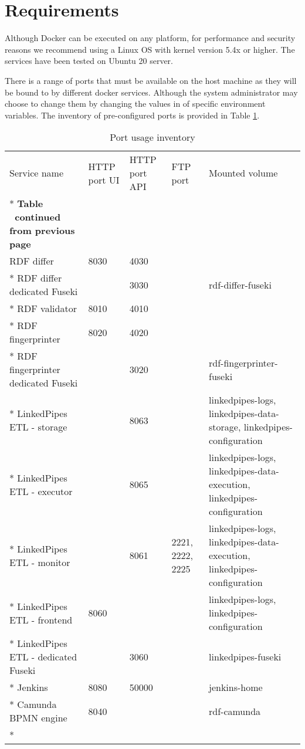\section{Requirements}
\label{sec:requirements}

	Although Docker can be executed on any platform, for performance and security reasons we recommend using a Linux OS with kernel version 5.4x or higher. The services have been tested on Ubuntu 20 server. 
		
	There is a range of ports that must be available on the host machine as they will be bound to by different docker services. Although the system administrator may choose to change them by changing the values in of specific environment variables. The inventory of pre-configured ports is provided in Table \ref{tab:port-inventory}.

	\begin{longtable}[c]{@{}p{3.64cm}p{1.25cm}p{1.25cm}p{1.9cm}p{5cm}@{}}
		\toprule
		Service name & HTTP port UI & HTTP port API & FTP port & Mounted volume \\* \midrule
		\endfirsthead
		\multicolumn{5}{c}%
		{{\bfseries Table \thetable\ continued from previous page}} \\
		\endhead
		\bottomrule
		\endfoot
		\endlastfoot
		RDF differ & 8030 & 4030 &  &  \\* \hline
		RDF differ dedicated Fuseki &  & 3030 &  & rdf-differ-fuseki \\* \hline
		RDF validator & 8010 & 4010 &  &  \\* \hline
		RDF fingerprinter & 8020 & 4020 &  &  \\* \hline
		RDF fingerprinter dedicated Fuseki &  & 3020 &  & rdf-fingerprinter-fuseki \\* \hline
		LinkedPipes ETL - storage &  & 8063 &  & linkedpipes-logs, linkedpipes-data-storage, linkedpipes-configuration \\* \hline
		LinkedPipes ETL - executor &  & 8065 &  & linkedpipes-logs, linkedpipes-data-execution, linkedpipes-configuration \\* \hline
		LinkedPipes ETL - monitor &  & 8061 & 2221, 2222, 2225 & linkedpipes-logs, linkedpipes-data-execution, linkedpipes-configuration \\* \hline
		LinkedPipes ETL - frontend & 8060 &  &  & linkedpipes-logs, linkedpipes-configuration \\* \hline
		LinkedPipes ETL - dedicated Fuseki &  & 3060 &  & linkedpipes-fuseki \\* \hline
		Jenkins & 8080 & 50000 &  & jenkins-home \\* \hline
		Camunda BPMN engine & 8040 &  &  & rdf-camunda \\* \bottomrule
		\caption{Port usage inventory}
		\label{tab:port-inventory}\\
	\end{longtable}

